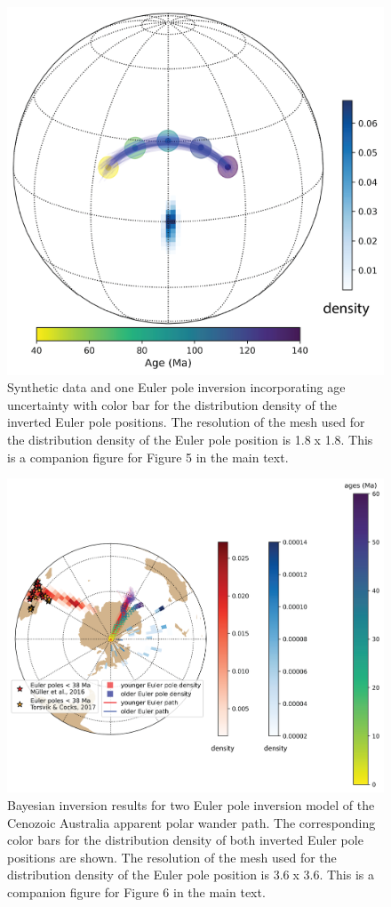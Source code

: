 \documentclass[11pt,letterpaper]{article}
\begin{document}
\begin{figure}[h!]
\centering
\noindent\includegraphics[width=.5\textwidth]{SI_inversion_with_age_uncertainties.png}
\caption{Synthetic data and one Euler pole inversion incorporating age uncertainty with color bar for the distribution density of the inverted Euler pole positions. The resolution of the mesh used for the distribution density of the Euler pole position is 1.8\textdegree$\;$x 1.8\textdegree. This is a companion figure for Figure 5 in the main text. }
\label{pdffiguresample}
\end{figure}

\begin{figure}[h!]
\noindent\includegraphics[width=.8\textwidth]{SI_aus_inversion.png}
\caption{Bayesian inversion results for two Euler pole inversion model of the Cenozoic Australia apparent polar wander path. The corresponding color bars for the distribution density of both inverted Euler pole positions are shown. The resolution of the mesh used for the distribution density of the Euler pole position is 3.6\textdegree$\;$x 3.6\textdegree. This is a companion figure for Figure 6 in the main text. }
\label{pdffiguresample}
\end{figure}
\end{document}
